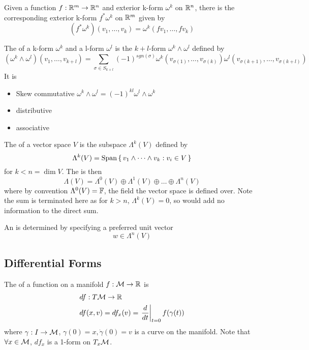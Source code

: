 \documentclass{article}
\begin{document}
\begin{definition}
Given a function $f:\mathbb{R}^m \to \mathbb{R}^n$ and exterior k-form $\omega^k$ on $\mathbb{R}^n$, there is the corresponding exterior k-form $f^\ast\omega^k$ on $\mathbb{R}^m$ given by 
\[
(f^\ast\omega^k)(v_1,\dots,v_k) = \omega^k(fv_1,\dots,fv_k)
\]
\end{definition}

\begin{definition}
The  of a k-form $\omega^k$ and a l-form $\omega^l$ is the $k+l$-form $\omega^k \wedge \omega^l$ defined by 
\[
(\omega^k\wedge\omega^l)(v_1,\dots,v_{k+l}) = \sum_{\sigma \in S_{k+l}} (-1)^{sgn(\sigma)} \omega^k(v_{\sigma(1)},\dots,v_{\sigma(k)}) \omega^l(v_{\sigma(k+1)},\dots,v_{\sigma(k+l)})
\]
It is 
\begin{itemize}
    \item Skew commutative $\omega^k \wedge \omega^l = (-1)^{kl} \omega^l \wedge \omega^k$
    \item distributive
    \item associative 
\end{itemize}
\end{definition}

\begin{definition}
The  of a vector space $V$ is the subspace $\Lambda^k(V)$ defined by 
\[
\Lambda^k(V) = \operatorname{Span}\set{v_1 \wedge \dots \wedge v_k : v_i \in V}
\]
for $k<n=\dim V$. The  is then 
\[
\Lambda(V) = \Lambda^0(V) \oplus \Lambda^1(V) \oplus \dots \oplus \Lambda^n(V)
\]
where by convention $\Lambda^0(V)=\mathbb{F}$, the field the vector space is defined over.  Note the sum is terminated here as for $k>n$, $\Lambda^k(V)=0$, so would add no information to the direct sum. 
\end{definition}

\begin{definition}[Orientation]
An  is determined by specifying a preferred unit vector 
\[
w \in \Lambda^n (V)
\]
\end{definition}

\subsection{Differential Forms}

\begin{definition}[Differential]
The  of a function on a manifold $f:\mathcal{M}\to\mathbb{R}$ is 
\begin{align*}
    & df : T\mathcal{M} \to \mathbb{R} \\
    & df(x,v) = df_x(v) = \left. \frac{d}{dt} \right\rvert_{t=0} f(\gamma(t))
\end{align*}
where $\gamma:I\to\mathcal{M}$, $\gamma(0)=x, \dot{\gamma}(0)=v$ is a curve on the manifold. Note that $\forall x\in\mathcal{M}$, $df_x$ is a 1-form on $T_x \mathcal{M}$.
\end{definition}
\end{document}
